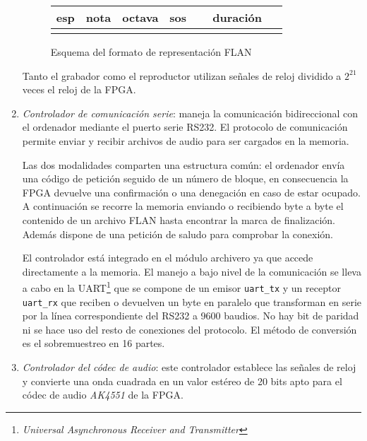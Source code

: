 \documentclass{article}
\begin{document}
\begin{enumerate}
	\begin{figure}[ht] \centering
		\begin{tabular}{| l | l | l | l | l | l | l | l | l | l | l | l | l | l | l | l |}
			\hline esp & \multicolumn{3}{c|}{nota} & \multicolumn{3}{c|}{octava} & sos & \multicolumn{8}{c|}{duración} \\ \hline
			& & & & & & & & & & & & & & & \\ \hline
		\end{tabular}

		\label{fig:flan}
		\caption{Esquema del formato de representación FLAN}
	\end{figure}

	Tanto el grabador como el reproductor utilizan señales de reloj dividido a $2^{21}$ veces el reloj de la FPGA.

	\item {\itshape Controlador de comunicación serie}: maneja la comunicación bidireccional con el ordenador mediante el puerto serie RS232. El protocolo de comunicación permite enviar y recibir archivos de audio para ser cargados en la memoria.

	Las dos modalidades comparten una estructura común: el ordenador envía una código de petición seguido de un número de bloque, en consecuencia la FPGA devuelve una confirmación o una denegación en caso de estar ocupado. A continuación se recorre la memoria enviando o recibiendo byte a byte el contenido de un archivo FLAN hasta encontrar la marca de finalización. Además dispone de una petición de saludo para comprobar la conexión.

	El controlador está integrado en el módulo archivero ya que accede directamente a la memoria. El manejo a bajo nivel de la comunicación se lleva a cabo en la UART\footnote{{\itshape Universal Asynchronous Receiver and Transmitter}} que se compone de un emisor \verb|uart_tx| y un receptor \verb|uart_rx| que reciben o devuelven un byte en paralelo que transforman en serie por la línea correspondiente del RS232 a 9600 baudios. No hay bit de paridad ni se hace uso del resto de conexiones del protocolo. El método de conversión es el sobremuestreo en 16 partes.

	\item {\itshape Controlador del códec de audio}: este controlador establece las señales de reloj y convierte una onda cuadrada en un valor estéreo de 20 bits apto para el códec de audio {\itshape AK4551} de la FPGA.
\end{enumerate}
\end{document}
